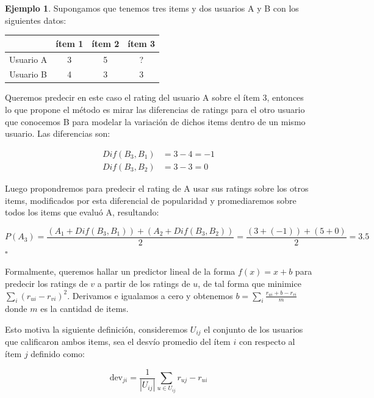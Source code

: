 \documentclass[hidelinks,12pt,a4paper]{book}
\theoremstyle{plain}
\theoremstyle{definition}
\newtheorem{ejemplo}{{\textbf{Ejemplo}}}[chapter]
\begin{document}
\begin{ejemplo}
Supongamos que tenemos tres items y dos usuarios A y B con los siguientes datos:

\begin{center}
\begin{tabular}{|c|c|c|c|}
\hline
 & ítem 1 & ítem 2 & ítem 3  \\
\hline
Usuario A & 3 & 5 & ? \\
Usuario B & 4 & 3 & 3 \\
\hline
\end{tabular}
\end{center}

Queremos predecir en este caso el rating del usuario A sobre el ítem 3, entonces lo que propone el método es mirar las diferencias de ratings para el otro usuario que conocemos B para modelar la variación de dichos items dentro de un mismo usuario. Las diferencias son:

\begin{eqnarray*}
Dif(B_3,B_1) &= 3 - 4 = -1\\
Dif(B_3,B_2) &= 3 - 3 = 0
\end{eqnarray*}

Luego propondremos para predecir el rating de A usar sus ratings sobre los otros items, modificados por esta diferencial de popularidad y promediaremos sobre todos los items que evaluó A, resultando:

\begin{equation*}
P(A_3) = \frac{(A_1 + Dif(B_3,B_1)) + (A_2 + Dif(B_3,B_2))}{2} = \frac{(3 +(-1)) + (5 + 0)}{2} = 3.5
\end{equation*}
\hfill$\square$
\end{ejemplo}

Formalmente, queremos hallar un  predictor lineal de la forma $f(x)=x+b$ para predecir los ratings de $v$ a partir de los ratings de $u$, de tal forma que minimice $\sum_{i} (r_{ui}-r_{vi})^2$. Derivamos e igualamos a cero y obtenemos $b=\sum_{i} \frac{r_{ui}+b-r_{vi}}{m}$ donde $m$ es la cantidad de items. 

Esto motiva la siguiente definición, consideremos $U_{ij}$ el conjunto de los usuarios que calificaron ambos items, sea el desvío promedio del ítem $i$ con respecto al ítem $j$ definido como:

\begin{equation}
\text{dev}_{ji}=\frac{1}{|U_{ij}|}\sum_{u \in U_{ij}} r_{uj}-r_{ui} 
\end{equation}
\end{document}
